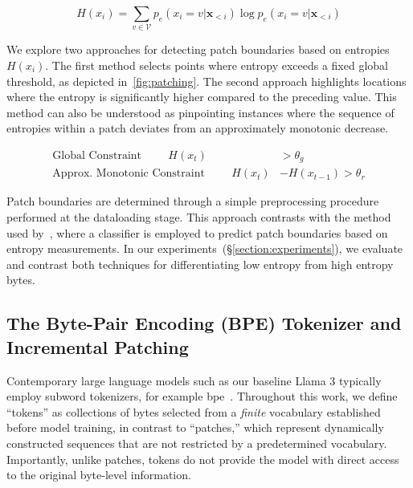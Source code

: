 \begin{equation}
H(x_i) = \sum_{v \in \mathcal{V}} p_{e}(x_i=v|\pmb{x}_{<i}) \log p_{e}(x_i=v|\pmb{x}_{<i})
\end{equation}

We explore two approaches for detecting patch boundaries based on entropies $H(x_i)$. The first method selects points where entropy exceeds a fixed global threshold, as depicted in~\autoref{fig:patching}. The second approach highlights locations where the entropy is significantly higher compared to the preceding value. This method can also be understood as pinpointing instances where the sequence of entropies within a patch deviates from an approximately monotonic decrease.

\begin{align*}
    \text{Global Constraint}\hspace{1cm}H(x_t)& > \theta_g\\
    \text{Approx. Monotonic Constraint}\hspace{1cm}H(x_t)& - H(x_{t-1}) > \theta_r
\end{align*}

Patch boundaries are determined through a simple preprocessing procedure performed at the dataloading stage. This approach contrasts with the method used by~\citet{nawrot-etal-2023-efficient}, where a classifier is employed to predict patch boundaries based on entropy measurements. In our experiments~(\S\ref{section:experiments}), we evaluate and contrast both techniques for differentiating low entropy from high entropy bytes.

\subsection{The Byte-Pair Encoding (BPE) Tokenizer and Incremental Patching}
\label{section:incremental-patching}
\label{section:bpe-patch}

Contemporary large language models such as our baseline Llama 3 typically employ subword tokenizers, for example bpe~\citep{gage1994new, sennrich-etal-2016-neural}. Throughout this work, we define ``tokens'' as collections of bytes selected from a \textit{finite} vocabulary established before model training, in contrast to ``patches,'' which represent dynamically constructed sequences that are not restricted by a predetermined vocabulary. Importantly, unlike patches, tokens do not provide the model with direct access to the original byte-level information.

